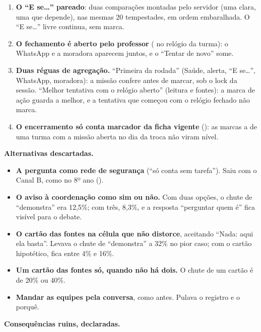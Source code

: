 \begin{enumerate}
  \item \textbf{O \enquote{E se\ldots} pareado}: duas comparações montadas
    pelo servidor (uma clara, uma que depende), nas mesmas 20 tempestades, em
    ordem embaralhada. O \enquote{E se\ldots} livre continua, sem marca.
  \item \textbf{O fechamento é aberto pelo professor}
    ( no relógio da turma): o WhatsApp e a moradora
    aparecem juntos, e o \enquote{Tentar de novo} some.
  \item \textbf{Duas réguas de agregação.} \enquote{Primeira da rodada} (Saúde,
    alerta, \enquote{E se\ldots}, WhatsApp, moradora): a missão confere
     antes de marcar, sob o lock da sessão. \enquote{Melhor
    tentativa com o relógio aberto} (leitura e fontes): a marca de ação guarda
    a melhor, e a tentativa que começou com o relógio fechado não marca.
  \item \textbf{O encerramento só conta marcador da ficha vigente}
    (): as marcas  a  de uma turma com a
    missão aberta no dia da troca não viram nível.
\end{enumerate}

\textbf{Alternativas descartadas.}

\begin{itemize}
  \item \textbf{A pergunta como rede de segurança} (\enquote{só conta sem
    tarefa}). Saiu com o Canal B, como no 8º ano ().
  \item \textbf{O aviso à coordenação como sim ou não.} Com duas opções, o
    chute de \enquote{demonstra} era 12,5\%; com três, 8,3\%, e a resposta
    \enquote{perguntar quem é} fica visível para o debate.
  \item \textbf{O cartão das fontes na célula que não distorce}, aceitando
    \enquote{Nada: aqui ela basta}. Levava o chute de \enquote{demonstra} a
    32\% no pior caso; com o cartão hipotético, fica entre 4\% e 16\%.
  \item \textbf{Um cartão das fontes só, quando não há dois.} O chute de um
    cartão é de 20\% ou 40\%.
  \item \textbf{Mandar as equipes pela conversa}, como antes. Pulava o
    registro e o porquê.
\end{itemize}

\textbf{Consequências ruins, declaradas.}

